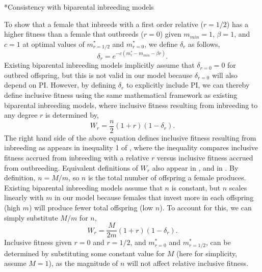 \documentclass[12pt]{article}
\makeatletter
\renewcommand\section{\@startsection{section}{1}{0in}{-0.5\baselineskip}{0.1\baselineskip}{\normalfont\large\bfseries}}
\makeatother
\begin{document}
\clearpage

\section*{Consistency with biparental inbreeding models}

To show that a female that inbreeds with a first order relative ($r=1/2$) has a higher fitness than a female that outbreeds ($r=0$) given $m_{min}=1$, $\beta=1$, and $c=1$ at optimal values of $m^{*}_{r=1/2}$ and $m^{*}_{r=0}$, we define $\delta_{r}$ as follows,
\begin{equation}
\delta_{r} = e^{-c(m^{*}_{r}-m_{min}-\beta r)}.
\end{equation}
Existing biparental inbreeding models \cite[e.g.,][]{Duthie2015a, Parker2006, Kokko2006} implicitly assume that $\delta_{r=0}=0$ for outbred offspring, but this is not valid in our model because $\delta_{r=0}$ will also depend on PI. However, by defining $\delta_{r}$ to explicitly include PI, we can thereby define inclusive fitness using the same mathematical framework as existing biparental inbreeding models, where inclusive fitness resulting from inbreeding to any degree $r$ is determined by,
\begin{equation}
W_{r} = \frac{n}{2}\left(1+r\right)\left(1-\delta_{r}\right).
\end{equation}
The right hand side of the above equation defines inclusive fitness resulting from inbreeding as appears in inequality 1 of \cite{Duthie2015a}, where the inequality compares inclusive fitness accrued from inbreeding with a relative $r$ versus inclusive fitness accrued from outbreeding. Equivalent definitions of $W_{r}$ also appear in \cite{Parker2006}, and in \cite{Kokko2006}. By definition, $n = M/m$, so $n$ is the total number of offspring a female produces. Existing biparental inbreeding models assume that $n$ is constant, but $n$ scales linearly with $m$ in our model because females that invest more in each offspring (high $m$) will produce fewer total offspring (low $n$). To account for this, we can simply substitute $M/m$ for $n$,
\begin{equation}
W_{r} = \frac{M}{2 m}\left(1+r\right)\left(1-\delta_{r}\right).
\end{equation}
Inclusive fitness given $r=0$ and $r=1/2$, and $m^{*}_{r=0}$ and $m^{*}_{r=1/2}$, can be determined by substituting some constant value for $M$ (here for simplicity, assume $M=1$), as the magnitude of $n$ will not affect relative inclusive fitness. 
\end{document}
